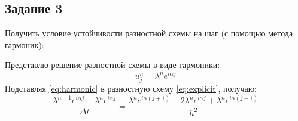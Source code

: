 \documentclass[12pt, a4paper]{report}
\begin{document}
	\subsection*{Задание 3}
	\large
	Получить условие устойчивости разностной схемы на шаг (с помощью метода гармоник): \par
	Представлю решение разностной схемы в виде гармоники:
	\begin{equation}\label{eq:harmonic}
		u_{j}^{n} = \lambda^{n}e^{i \alpha j}
	\end{equation}
	Подставляя \eqref{eq:harmonic} в разностную схему \eqref{eq:explicit}, получаю:
	\begin{equation*}
		\frac{\lambda^{n+1}e^{i \alpha j} - \lambda^{n}e^{i \alpha j}}{\Delta t} = \frac{\lambda^{n}e^{i \alpha (j+1)} - 2\lambda^{n}e^{i \alpha j} + \lambda^{n}e^{i \alpha (j-1)}}{h^{2}}
	\end{equation*}
\end{document}
